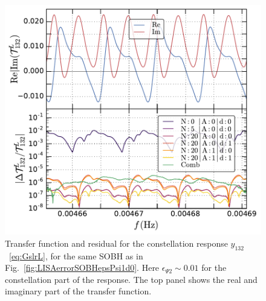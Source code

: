 \documentclass[aps,showpacs,twocolumn,
prd,superscriptaddress,nofootinbib]{revtex4-1}
\begin{document}
\begin{figure}
  \centering
  \includegraphics[width=.98\linewidth]{plots/LISAtransfererrorSOBHepsPsi1y12L_py.pdf}
  \caption{Transfer function and residual for the constellation response $y_{132}$~\eqref{eq:GslrL}, for the same SOBH as in Fig.~\ref{fig:LISAerrorSOBHepsPsi1d0}. Here $\epsilon_{\Psi 2}\sim 0.01$ for the constellation part of the response. The top panel shows the real and imaginary part of the transfer function.}
  \label{fig:LISAerrorSOBHepsPsi1const}
\end{figure}
\end{document}
